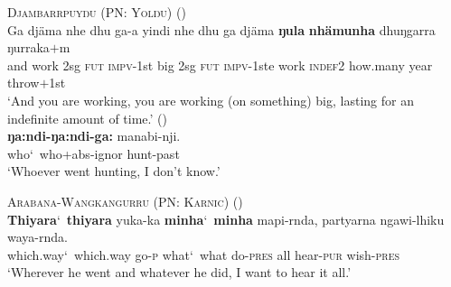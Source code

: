 \documentclass{article}
\begin{document}
\begin{exe}
  \ex \textsc{Djambarrpuyŋu (PN: Yolŋu)} (\citealt[393]{wilkinson91})\\
  \gll %
  Ga     djäma    nhe    dhu    ga-a        yindi    nhe    dhu    ga     djäma    \textbf{ŋula}        \textbf{nhämunha}    dhuŋgarra    ŋurraka$+$m\\
  and    work    2sg    \textsc{fut}    \textsc{impv}-1st    big    2sg    \textsc{fut}    \textsc{impv}-1ste   work    \textsc{indef2}    how.many    year        throw$+$1st\\
  \glt `And you are working, you are working (on something) big, lasting for an indefinite amount of time.'
   (\citealt[271]{donaldson80}) \\
  \gll \textbf{ŋa:ndi-ŋa:ndi-ga:} manabi-nji.\\
  who\char`~who+{\sc abs}-{\sc ignor} hunt-{\sc past}\\
  \glt `Whoever went hunting, I don't know.' 

  
  \ex \textsc{Arabana-Wangkangurru (PN: Karnic)} (\citealt[129]{hercus94})\\
  \gll \textbf{Thiyara}\char`~\textbf{thiyara} yuka-ka \textbf{minha}\char`~\textbf{minha} mapi-rnda, partyarna ngawi-lhiku waya-rnda.\\
  which.way\char`~which.way go-\textsc{p} what\char`~what do-\textsc{pres} all hear-\textsc{pur} wish-\textsc{pres}\\
  \glt `Wherever he went and whatever he did, I want to hear it all.' %
\end{exe}
\end{document}
